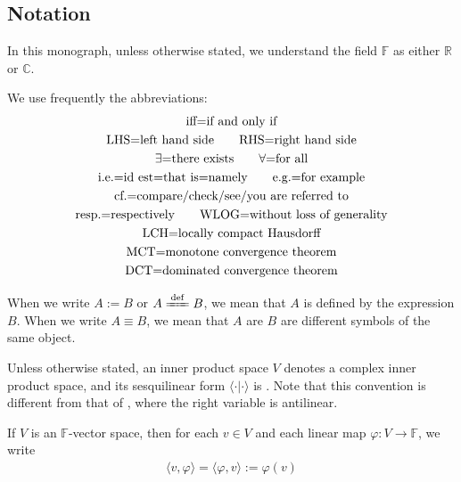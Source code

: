 \documentclass[12pt,b5paper,notitlepage]{article}
\theoremstyle{definition}
\theoremstyle{plain}
\newcommand{\bk}[1]{\langle {#1}\rangle}
\newcommand{\Cbb}{\mathbb C}
\newcommand{\Rbb}{\mathbb R}
\newcommand{\Fbb}{\mathbb F}
\numberwithin{equation}{section}
\begin{document}
\subsection{Notation}\label{lb251}

In this monograph, unless otherwise stated, we understand the field $\Fbb$ as either $\Rbb$ or $\Cbb$.

We use frequently the abbreviations:
\begin{gather*}
\text{iff=if and only if}\\
\text{LHS=left hand side}\qquad
\text{RHS=right hand side}\\
\text{$\exists$=there exists}\qquad \text{$\forall$=for all}\\
\text{i.e.=id est=that is=namely}\qquad\text{e.g.=for example}\\
\text{cf.=compare/check/see/you are referred to}\\
\text{resp.=respectively}\qquad 
\text{WLOG=without loss of generality}\\
\text{LCH=locally compact Hausdorff\index{00@LCH=locally compact Hausdorff}}\\
\text{MCT=monotone convergence theorem}\index{00@MCT=monotone convergence theorem}\\
\text{DCT=dominated convergence theorem}\index{00@DCT=dominated convergence theorem}
\end{gather*}

When we write $A:=B$ or $A\xlongequal{\mathrm{def}}B$, we mean that $A$ is defined by the expression $B$. When we write $A\equiv B$, we mean that $A$ are $B$ are different symbols of the same object.





Unless otherwise stated, an inner product space $V$ denotes a complex inner product space, and its sesquilinear form $\bk{\cdot|\cdot}$ is . Note that this convention is different from that of \cite{Gui-A}, where the right variable is antilinear.


If $V$ is an $\Fbb$-vector space, then for each $v\in V$ and each linear map $\varphi:V\rightarrow\Fbb$, we write
\begin{align*}
\bk{v,\varphi}=\bk{\varphi,v}:=\varphi(v)
\end{align*}
\end{document}
